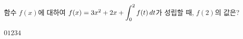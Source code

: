 함수 $f(x)$에 대하여 $f(x)=3x^2+2x+\displaystyle\int_{0}^{2}f(t)\mkern3mu dt$가 성립할 때, $f(2)$의 값은?
\begin{choices32}{$0$}{$1$}{$2$}{$3$}{$4$}\end{choices32}

